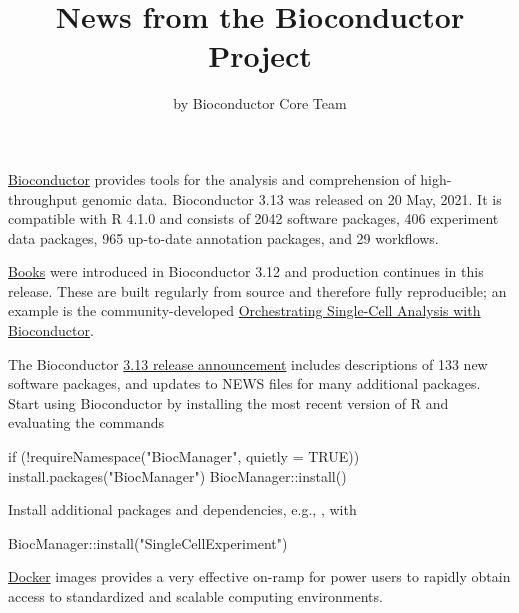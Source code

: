 \title{News from the Bioconductor Project}
\author{by Bioconductor Core Team}
\maketitle

\href{https://bioconductor.org}{Bioconductor} provides
tools for the analysis and comprehension of high-throughput genomic
data. Bioconductor 3.13 was released on 20 May, 2021. It is
compatible with R 4.1.0 and consists of 2042 software packages, 406
experiment data packages, 965 up-to-date annotation packages, and 29
workflows. 

\href{https://bioconductor.org/books/release/}{Books} were introduced in
Bioconductor 3.12 and production continues in this release.
These are built regularly from source and therefore fully
reproducible; an example is the
community-developed \href{https://bioconductor.org/books/release/OSCA/}{Orchestrating
Single-Cell Analysis with Bioconductor}.

The Bioconductor
\href{https://bioconductor.org/news/bioc_3_13_release/}{3.13 release
  announcement} includes descriptions of 133 new software packages,
and updates to NEWS files for many additional packages.  Start using
Bioconductor by installing the most recent version of R and evaluating
the commands
\begin{example}
  if (!requireNamespace("BiocManager", quietly = TRUE))
      install.packages("BiocManager")
  BiocManager::install()
\end{example}
Install additional packages and dependencies,
e.g., , with
\begin{example}
  BiocManager::install("SingleCellExperiment")
\end{example}
\href{https://bioconductor.org/help/docker/}{Docker}
images provides a very effective on-ramp for power users to rapidly
obtain access to standardized and scalable computing environments.

